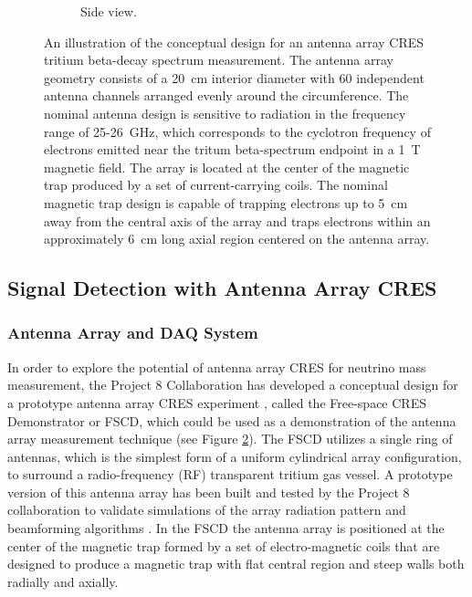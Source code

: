 \begin{figure}[h]
\begin{subfigure}{0.48\textwidth}
        \caption{Side view.}
        \label{fig:apparatus_concept_side}
    \end{subfigure}
    \caption{An illustration of the conceptual design for an antenna array CRES tritium beta-decay spectrum measurement. The antenna array geometry consists of a 20~cm interior diameter with 60 independent antenna channels arranged evenly around the circumference. The nominal antenna design is sensitive to radiation in the frequency range of 25-26~GHz, which corresponds to the cyclotron frequency of electrons emitted near the tritum beta-spectrum endpoint in a 1~T magnetic field. The array is located at the center of the magnetic trap produced by a set of current-carrying coils. The nominal magnetic trap design is capable of trapping electrons up to 5~cm away from the central axis of the array and traps electrons within an approximately 6~cm long axial region centered on the antenna array.}
    \label{fig:apparatus_concept}
\end{figure}


\subsection{Signal Detection with Antenna Array CRES}
\label{sec:real-time-triggering}


\subsubsection{Antenna Array and DAQ System}
\label{sec:aa-and-daq}

In order to explore the potential of antenna array CRES for neutrino mass measurement, the Project 8 Collaboration has developed a conceptual design for a prototype antenna array CRES experiment \cite{p8PanicProc,p8snowmass2022}, called the Free-space CRES Demonstrator or FSCD, which could be used as a demonstration of the antenna array measurement technique (see Figure \ref{fig:apparatus_concept}). The FSCD utilizes a single ring of antennas, which is the simplest form of a uniform cylindrical array configuration, to surround a radio-frequency (RF) transparent tritium gas vessel. A prototype version of this antenna array has been built and tested by the Project 8 collaboration to validate simulations of the array radiation pattern and beamforming algorithms \cite{p8jugaad}. In the FSCD the antenna array is positioned at the center of the magnetic trap formed by a set of electro-magnetic coils that are designed to produce a magnetic trap with flat central region and steep walls both radially and axially. 

